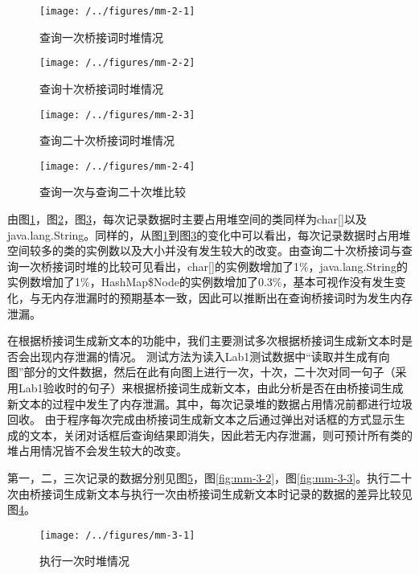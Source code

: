 \begin{figure}
\centering
\texttt{[image: /../figures/mm-2-1]}
\caption{查询一次桥接词时堆情况}
\label{fig:mm-2-1}
\end{figure}

\begin{figure}
\centering
\texttt{[image: /../figures/mm-2-2]}
\caption{查询十次桥接词时堆情况}
\label{fig:mm-2-2}
\end{figure}

\begin{figure}
\centering
\texttt{[image: /../figures/mm-2-3]}
\caption{查询二十次桥接词时堆情况}
\label{fig:mm-2-3}
\end{figure}

\begin{figure}
\centering
\texttt{[image: /../figures/mm-2-4]}
\caption{查询一次与查询二十次堆比较}
\label{fig:mm-2-4}
\end{figure}

由图\ref{fig:mm-2-1}，图\ref{fig:mm-2-2}，图\ref{fig:mm-2-3}，每次记录数据时主要占用堆空间的类同样为char[]以及java.lang.String。同样的，从图\ref{fig:mm-2-1}到图\ref{fig:mm-2-3}的变化中可以看出，每次记录数据时占用堆空间较多的类的实例数以及大小并没有发生较大的改变。由查询二十次桥接词与查询一次桥接词时堆的比较可见看出，char[]的实例数增加了1\%，java.lang.String的实例数增加了1\%，HashMap\$Node的实例数增加了0.3\%，基本可视作没有发生变化，与无内存泄漏时的预期基本一致，因此可以推断出在查询桥接词时为发生内存泄漏。

在根据桥接词生成新文本的功能中，我们主要测试多次根据桥接词生成新文本时是否会出现内存泄漏的情况。
测试方法为读入Lab1测试数据中“读取并生成有向图”部分的文件数据，然后在此有向图上进行一次，十次，二十次对同一句子（采用Lab1验收时的句子）来根据桥接词生成新文本，由此分析是否在由桥接词生成新文本的过程中发生了内存泄漏。其中，每次记录堆的数据占用情况前都进行垃圾回收。
由于程序每次完成由桥接词生成新文本之后通过弹出对话框的方式显示生成的文本，关闭对话框后查询结果即消失，因此若无内存泄漏，则可预计所有类的堆占用情况皆不会发生较大的改变。

第一，二，三次记录的数据分别见图\ref{fig:mm-3-1}，图\ref{fig:mm-3-2}，图\ref{fig:mm-3-3}。执行二十次由桥接词生成新文本与执行一次由桥接词生成新文本时记录的数据的差异比较见图\ref{fig:mm-2-4}。

\begin{figure}
\centering
\texttt{[image: /../figures/mm-3-1]}
\caption{执行一次时堆情况}
\label{fig:mm-3-1}
\end{figure}

